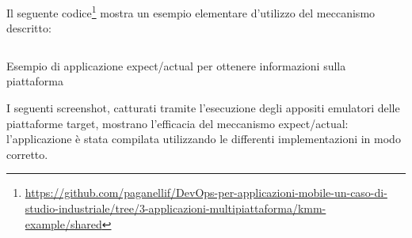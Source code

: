 Il seguente codice\footnote{\href{https://github.com/paganellif/DevOps-per-applicazioni-mobile-un-caso-di-studio-industriale/tree/3-applicazioni-multipiattaforma/kmm-example/shared}{https://github.com/paganellif/DevOps-per-applicazioni-mobile-un-caso-di-studio-industriale/tree/3-applicazioni-multipiattaforma/kmm-example/shared}} mostra un esempio elementare d'utilizzo del meccanismo descritto:

\begin{listing}[H]
    \inputminted{kotlin}{code/expect-actual.kt}
    \caption{Esempio di applicazione expect/actual per ottenere informazioni sulla piattaforma}
\end{listing}

I seguenti screenshot, 
catturati tramite l'esecuzione degli appositi emulatori delle piattaforme target, 
mostrano l'efficacia del meccanismo expect/actual: 
l'applicazione è stata compilata utilizzando le differenti implementazioni in modo corretto.

